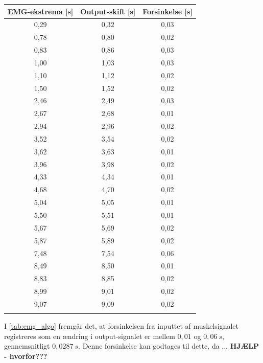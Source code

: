 \begin{tabular}{|c|c|c|}
\hline 
EMG-ekstrema [s] & Output-skift [s] & Forsinkelse [s]\\ 
\hline 
0,29 & 0,32 & 0,03\\ 
\hline 
0,78 & 0,80 & 0,02\\ 
\hline 
0,83 & 0,86 & 0,03\\ 
\hline 
1,00 & 1,03 & 0,03\\ 
\hline 
1,10 & 1,12 & 0,02\\ 
\hline 
1,50 & 1,52 & 0,02\\ 
\hline 
2,46 & 2,49 & 0,03\\ 
\hline 
2,67 & 2,68 & 0,01\\ 
\hline 
2,94 & 2,96 & 0,02\\ 
\hline 
3,52 & 3,54 & 0,02\\ 
\hline 
3,62 & 3,63 & 0,01\\ 
\hline 
3,96 & 3,98 & 0,02\\ 
\hline 
4,33 & 4,34 & 0,01\\ 
\hline 
4,68 & 4,70 & 0,02\\ 
\hline 
5,04 & 5,05 & 0,01\\ 
\hline 
5,50 & 5,51 & 0,01\\ 
\hline 
5,67 & 5,69 & 0,02\\ 
\hline 
5,87 & 5,89 & 0,02\\ 
\hline 
7,48 & 7,54 & 0,06\\ 
\hline 
8,49 & 8,50 & 0,01\\ 
\hline 
8,83 & 8,85 & 0,02\\ 
\hline 
8,99 & 9,01 & 0,02\\ 
\hline 
9,07 & 9,09 & 0,02\\ 
\label{tab:emg_algo}
\end{tabular} 

\noindent
I \autoref{tab:emg_algo} fremgår det, at forsinkelsen fra inputtet af muskelsignalet registreres som en ændring i output-signalet er mellem $0,01$ og $0,06~s$, gennemsnitligt $0,0287~s$. Denne forsinkelse kan godtages til dette, da ... \textbf{HJÆLP - hvorfor???}